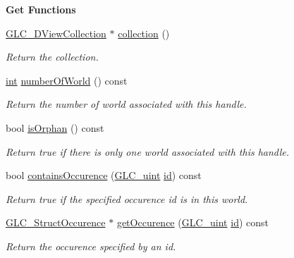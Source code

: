 \begin{Indent}{\bf Get Functions}\par
\begin{DoxyCompactItemize}
\item 
\hyperlink{class_g_l_c__3_d_view_collection}{G\-L\-C\-\_\-D\-View\-Collection} $\ast$ \hyperlink{class_g_l_c___world_handle_a0de6e0e48e5c24805e379721b968b461}{collection} ()
\begin{DoxyCompactList}\small\item\em Return the collection. \end{DoxyCompactList}\item 
\hyperlink{ioapi_8h_a787fa3cf048117ba7123753c1e74fcd6}{int} \hyperlink{class_g_l_c___world_handle_a94854392b93a0646fa809f1120d7b7a3}{number\-Of\-World} () const 
\begin{DoxyCompactList}\small\item\em Return the number of world associated with this handle. \end{DoxyCompactList}\item 
bool \hyperlink{class_g_l_c___world_handle_a580e7fe26e0d3cad31712ed03ecfbe8d}{is\-Orphan} () const 
\begin{DoxyCompactList}\small\item\em Return true if there is only one world associated with this handle. \end{DoxyCompactList}\item 
bool \hyperlink{class_g_l_c___world_handle_a95ea7344d9dc15ac019b7965eea1b258}{contains\-Occurence} (\hyperlink{glc__global_8h_abf950976fabed69026558df8e2da6c6b}{G\-L\-C\-\_\-uint} \hyperlink{glext_8h_a58c2a664503e14ffb8f21012aabff3e9}{id}) const 
\begin{DoxyCompactList}\small\item\em Return true if the specified occurence id is in this world. \end{DoxyCompactList}\item 
\hyperlink{class_g_l_c___struct_occurence}{G\-L\-C\-\_\-\-Struct\-Occurence} $\ast$ \hyperlink{class_g_l_c___world_handle_a420fd2dcf5c4e119c9bc5180daef9bef}{get\-Occurence} (\hyperlink{glc__global_8h_abf950976fabed69026558df8e2da6c6b}{G\-L\-C\-\_\-uint} \hyperlink{glext_8h_a58c2a664503e14ffb8f21012aabff3e9}{id}) const 
\begin{DoxyCompactList}\small\item\em Return the occurence specified by an id. \end{DoxyCompactList}\item 

\end{DoxyCompactItemize}
\end{Indent}

